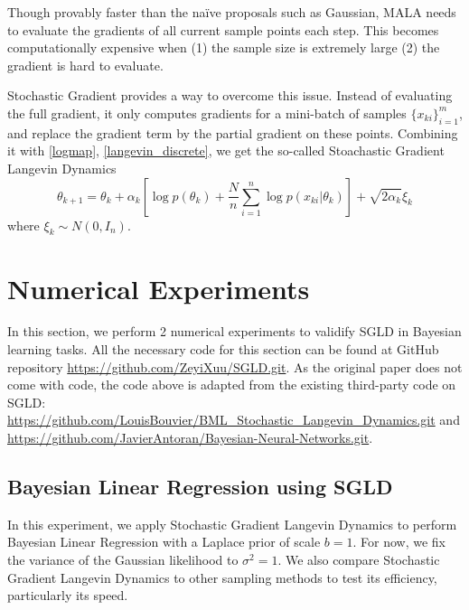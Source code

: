 \documentclass[10pt]{amsart}
\begin{document}
Though provably faster than the na\"ive proposals such as Gaussian, MALA needs to evaluate the gradients of all current sample points each step. This becomes computationally expensive when (1) the sample size is extremely large (2) the gradient is hard to evaluate.

Stochastic Gradient provides a way to overcome this issue. Instead of evaluating the full gradient, it only computes gradients for a mini-batch of samples $\{x_{ki}\}_{i=1}^m$, and replace the gradient term by the partial gradient on these points. Combining it with \eqref{logmap}, \eqref{langevin_discrete}, we get the so-called Stoachastic Gradient Langevin Dynamics 
\begin{equation}\label{SGLD}
    \theta_{k+1}=\theta_k + \alpha_k\left[\log p(\theta_k)+\frac{N}{n}\sum_{i=1}^n \log p(x_{ki}|\theta_k)\right]+\sqrt{2\alpha_k}\xi_k    
\end{equation}
where $\xi_k\sim N(0,I_n)$.

\section{Numerical Experiments}
In this section, we perform 2 numerical experiments to validify SGLD in Bayesian learning tasks. All the necessary code for this section can be found at GitHub repository \href{https://github.com/ZeyiXuu/SGLD.git}{https://github.com/ZeyiXuu/SGLD.git}. As the original paper does not come with code, the code above is adapted from the existing third-party code on SGLD: \href{https://github.com/LouisBouvier/BML_Stochastic_Langevin_Dynamics.git}{https://github.com/LouisBouvier/BML\_Stochastic\_Langevin\_Dynamics.git} and \href{https://github.com/JavierAntoran/Bayesian-Neural-Networks.git}{https://github.com/JavierAntoran/Bayesian-Neural-Networks.git}.
\subsection{Bayesian Linear Regression using SGLD}

In this experiment, we apply Stochastic Gradient Langevin Dynamics to perform Bayesian Linear Regression with a Laplace prior of scale \( b=1 \). For now, we fix the variance of the Gaussian likelihood to \( \sigma^2=1 \). We also compare Stochastic Gradient Langevin Dynamics to other sampling methods to test its efficiency, particularly its speed.
\end{document}
